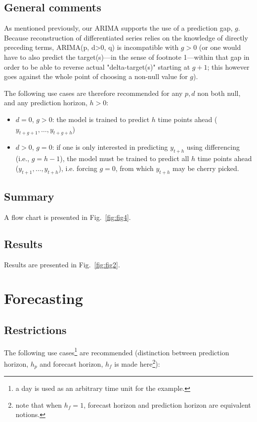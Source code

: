 \documentclass{article}
\begin{document}
\subsection{General comments}
As mentioned previously, our ARIMA supports the use of a prediction gap, $g$. Because reconstruction of differentiated series relies on the knowledge of directly preceding terms, ARIMA(p, d>0, q) is incompatible with $g>0$ (or one would have to also predict the target(s)---in the sense of footnote 1---within that gap in order to be able to reverse actual "delta-target(s)" starting at $g+1$; this however goes against the whole point of choosing a non-null value for $g$). 

The following use cases are therefore recommended for any $p,d$ non both null, and any prediction horizon, $h>0$:

\begin{itemize}
\item $d=0$, $g>0$: the model is trained to predict $h$ time points ahead ($y_{t+g+1}, \dots, y_{t+g+h}$)
\item $d>0$, $g=0$: if one is only interested in predicting $y_{t+h}$ using differencing (i.e., $g=h-1$), the model must be trained to predict all $h$ time points ahead ($y_{t+1}, \dots, y_{t+h}$), i.e. forcing $g=0$, from which $y_{t+h}$ may be cherry picked. 
\end{itemize}


\subsection{Summary}
A flow chart is presented in Fig.~\ref{fig:fig4}.


\subsection{Results}
Results are presented in Fig.~\ref{fig:fig2}.

\section{Forecasting}
\subsection{Restrictions}
The following use cases\footnote{a day is used as an arbitrary time unit for the example.} are recommended (distinction between prediction horizon, $h_p$ and forecast horizon, $h_f$ is made here\footnote{note that when $h_f=1$, forecast horizon and prediction horizon are equivalent notions.}):
\end{document}
